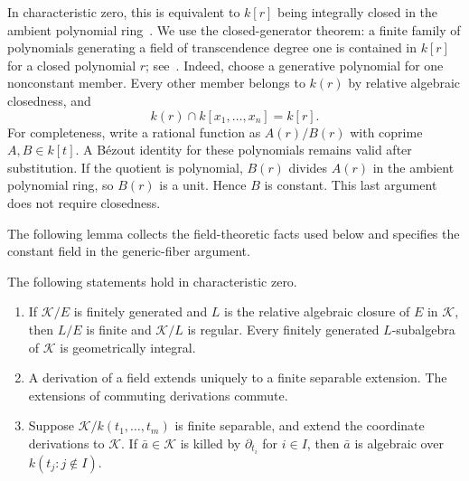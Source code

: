 In characteristic zero, this is equivalent to $k[r]$ being integrally closed in the ambient polynomial ring~\cite[Lemma~3]{ArzhantsevPetravchuk}. We use the closed-generator theorem: a finite family of polynomials generating a field of transcendence degree one is contained in $k[r]$ for a closed polynomial $r$; see~\cite{ArzhantsevPetravchuk}. Indeed, choose a generative polynomial for one nonconstant member. Every other member belongs to $k(r)$ by relative algebraic closedness, and
\begin{equation}\label{eq:intersection}
 k(r)\cap k[x_1,\ldots,x_n]=k[r].
\end{equation}
For completeness, write a rational function as $A(r)/B(r)$ with coprime $A,B\in k[t]$. A B\'ezout identity for these polynomials remains valid after substitution. If the quotient is polynomial, $B(r)$ divides $A(r)$ in the ambient polynomial ring, so $B(r)$ is a unit. Hence $B$ is constant. This last argument does not require closedness.

The following lemma collects the field-theoretic facts used below and specifies the constant field in the generic-fiber argument.

\begin{lemma}\label{lem:field-facts}
The following statements hold in characteristic zero.
\begin{enumerate}
\item If $\mathcal K/E$ is finitely generated and $L$ is the relative algebraic closure of $E$ in $\mathcal K$, then $L/E$ is finite and $\mathcal K/L$ is regular. Every finitely generated $L$-subalgebra of $\mathcal K$ is geometrically integral.
\item A derivation of a field extends uniquely to a finite separable extension. The extensions of commuting derivations commute.
\item Suppose $\mathcal K/k(t_1,\ldots,t_m)$ is finite separable, and extend the coordinate derivations to $\mathcal K$. If $\bar{a}\in \mathcal K$ is killed by $\partial_{t_i}$ for $i\in I$, then $\bar{a}$ is algebraic over $k(t_j:j\notin I)$.
\end{enumerate}
\end{lemma}

